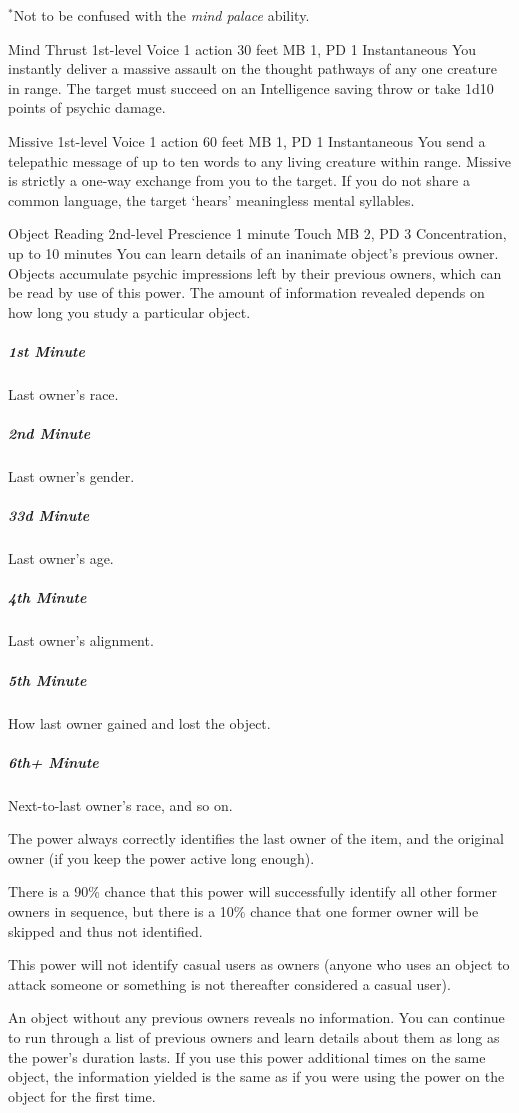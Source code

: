   $^*$Not to be confused with the \emph{mind palace} ability.

\DndPowerHeader%
  {Mind Thrust}
  {1st-level Voice}
  {1 action}
  {30 feet}
  {MB 1, PD 1}
  {Instantaneous}
You instantly deliver a massive assault on the thought pathways
of any one creature in range.
The target must succeed on an Intelligence saving throw
or take 1d10 points of psychic damage.

\DndPowerHeader%
  {Missive}
  {1st-level Voice}
  {1 action}
  {60 feet}
  {MB 1, PD 1}
  {Instantaneous}
  You send a telepathic message of up to ten words to
  any living creature within range.
  Missive is strictly a one-way exchange from you to the target.
  If you do not share a common language,
  the target `hears' meaningless mental syllables.

\DndPowerHeader%
  {Object Reading}
  {2nd-level Prescience}
  {1 minute}
  {Touch}
  {MB 2, PD 3}
  {Concentration, up to 10 minutes}
  You can learn details of an inanimate object's previous owner.
  Objects accumulate psychic impressions
  left by their previous owners,
  which can be read by use of this power.
  The amount of information revealed depends
  on how long you study a particular object.

  \subparagraph{1st Minute}
    Last owner's race.
  \subparagraph{2nd Minute}
    Last owner's gender.
  \subparagraph{33d Minute}
    Last owner's age.
  \subparagraph{4th Minute}
    Last owner's alignment.
  \subparagraph{5th Minute}
    How last owner gained and lost the object.
  \subparagraph{6th+ Minute}
    Next-to-last owner's race, and so on.
  
  The power always correctly identifies the last owner of the item,
  and the original owner
  (if you keep the power active long enough).
  
  There is a 90\% chance
  that this power will successfully identify all other former owners
  in sequence,
  but there is a 10\% chance that one former owner
  will be skipped and thus not identified.
  
  This power will not identify casual users as owners
  (anyone who uses an object to attack someone
  or something is not thereafter considered a casual user).
  
  An object without any previous owners reveals no information.
  You can continue to run through a list of previous owners
  and learn details about them as long as the power's duration lasts.
  If you use this power additional times on the same object,
  the information yielded is the same
  as if you were using the power on the object for the first time.

